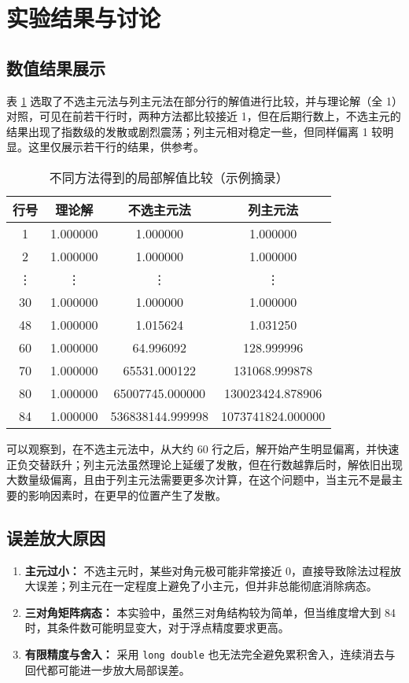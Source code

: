 \documentclass[UTF8]{ctexart}
\begin{document}
\section{实验结果与讨论}

\subsection{数值结果展示}
表 \ref{table:comp} 选取了不选主元法与列主元法在部分行的解值进行比较，并与理论解（全 1）对照，可见在前若干行时，两种方法都比较接近 1，但在后期行数上，不选主元的结果出现了指数级的发散或剧烈震荡；列主元相对稳定一些，但同样偏离 1 较明显。这里仅展示若干行的结果，供参考。

\begin{table}[h]
\centering
\caption{不同方法得到的局部解值比较（示例摘录）}
\label{table:comp}
\begin{tabular}{c|c|c|c}
\hline
\textbf{行号} & \textbf{理论解} & \textbf{不选主元法} & \textbf{列主元法} \\
\hline
1   & 1.000000 & 1.000000 & 1.000000 \\
2   & 1.000000 & 1.000000 & 1.000000 \\
\vdots & \vdots & \vdots & \vdots \\
30  & 1.000000 & 1.000000 & 1.000000 \\
48 &  1.000000 & 1.015624 & 1.031250 \\
60  & 1.000000 & 64.996092 & 128.999996 \\
70  & 1.000000 & 65531.000122 & 131068.999878 \\
80  & 1.000000 & 65007745.000000 & 130023424.878906 \\
84  & 1.000000 & 536838144.999998 & 1073741824.000000 \\
\hline
\end{tabular}
\end{table}

可以观察到，在不选主元法中，从大约 60 行之后，解开始产生明显偏离，并快速正负交替跃升；列主元法虽然理论上延缓了发散，但在行数越靠后时，解依旧出现大数量级偏离，且由于列主元法需要更多次计算，在这个问题中，当主元不是最主要的影响因素时，在更早的位置产生了发散。

\subsection{误差放大原因}
\begin{enumerate}
\item \textbf{主元过小：} 不选主元时，某些对角元极可能非常接近 0，直接导致除法过程放大误差；列主元在一定程度上避免了小主元，但并非总能彻底消除病态。
\item \textbf{三对角矩阵病态：} 本实验中，虽然三对角结构较为简单，但当维度增大到 84 时，其条件数可能明显变大，对于浮点精度要求更高。
\item \textbf{有限精度与舍入：} 采用 \texttt{long double} 也无法完全避免累积舍入，连续消去与回代都可能进一步放大局部误差。
\end{enumerate}
\end{document}
